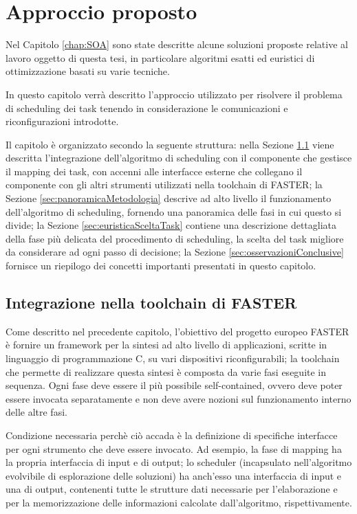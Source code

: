 \chapter{Approccio proposto}
\label{chap:approccio}
\vspace{1cm}
Nel Capitolo \ref{chap:SOA} sono state descritte alcune soluzioni proposte 
relative al lavoro oggetto di questa tesi, in particolare algoritmi esatti ed
euristici di ottimizzazione basati su varie tecniche.

In questo capitolo verrà descritto l'approccio utilizzato per risolvere il 
problema di scheduling dei task tenendo in considerazione le comunicazioni e 
riconfigurazioni introdotte.

Il capitolo è organizzato secondo la seguente struttura: nella Sezione 
\ref{sec:integrazioneToolchainFASTER} viene descritta l'integrazione 
dell'algoritmo di scheduling con il componente che gestisce il mapping dei task, 
con accenni alle interfacce esterne che collegano il componente 
con gli altri strumenti utilizzati nella toolchain di \acs{FASTER}; la Sezione 
\ref{sec:panoramicaMetodologia} descrive  ad alto livello il funzionamento 
dell'algoritmo di scheduling, fornendo una panoramica delle fasi in cui questo 
si divide; la Sezione \ref{sec:euristicaSceltaTask} contiene una descrizione 
dettagliata della fase più delicata del procedimento di scheduling, la scelta 
del task migliore da considerare ad ogni passo di decisione; la Sezione 
\ref{sec:osservazioniConclusive} fornisce un riepilogo dei concetti importanti 
presentati in questo capitolo.


\section{Integrazione nella toolchain di \ac{FASTER}}
\label{sec:integrazioneToolchainFASTER}

Come descritto nel precedente capitolo, l'obiettivo del progetto europeo 
\ac{FASTER} è fornire un framework per la sintesi ad alto livello di 
applicazioni, scritte in linguaggio di programmazione C, su vari dispositivi 
riconfigurabili; la toolchain che permette di realizzare questa sintesi è 
composta da varie fasi eseguite in sequenza. Ogni fase deve essere il più 
possibile self-contained, ovvero deve poter essere invocata separatamente e non 
deve avere nozioni sul funzionamento interno delle altre fasi.

Condizione necessaria perchè ciò accada è la definizione di specifiche 
interfacce per ogni strumento che deve essere invocato. Ad esempio, la fase di 
mapping ha la propria interfaccia di input e di output; lo scheduler 
(incapsulato nell'algoritmo evolvibile di esplorazione delle soluzioni) ha 
anch'esso una interfaccia di input e una di output, contenenti tutte 
le strutture dati necessarie per l'elaborazione e per la memorizzazione delle 
informazioni calcolate dall'algoritmo, rispettivamente. 


